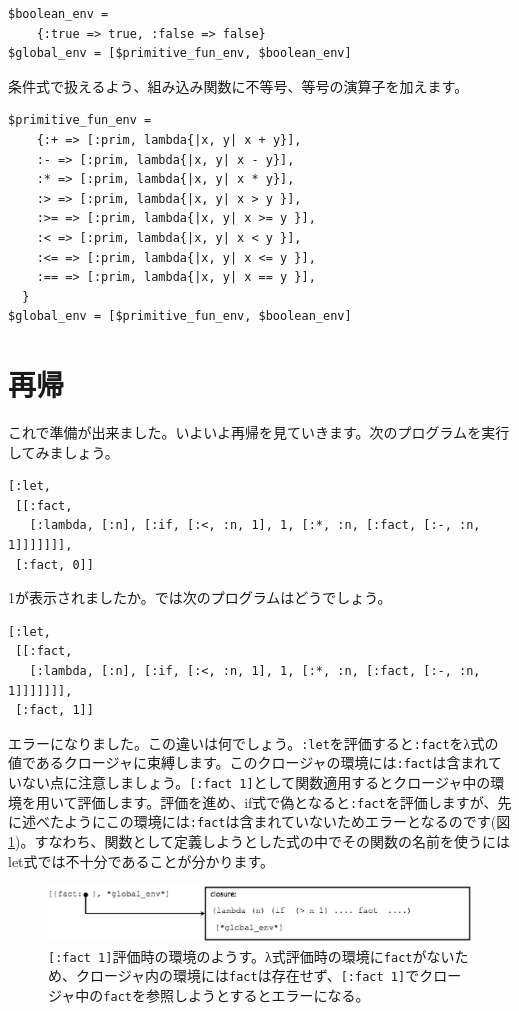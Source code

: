 \begin{lstlisting}
$boolean_env = 
    {:true => true, :false => false}
$global_env = [$primitive_fun_env, $boolean_env]
\end{lstlisting}

条件式で扱えるよう、組み込み関数に不等号、等号の演算子を加えます。

\begin{lstlisting}
$primitive_fun_env = 
    {:+ => [:prim, lambda{|x, y| x + y}],
    :- => [:prim, lambda{|x, y| x - y}],
    :* => [:prim, lambda{|x, y| x * y}],
    :> => [:prim, lambda{|x, y| x > y }],
    :>= => [:prim, lambda{|x, y| x >= y }],
    :< => [:prim, lambda{|x, y| x < y }],
    :<= => [:prim, lambda{|x, y| x <= y }],
    :== => [:prim, lambda{|x, y| x == y }],
  }
$global_env = [$primitive_fun_env, $boolean_env]
\end{lstlisting}

\section{再帰}

これで準備が出来ました。いよいよ再帰を見ていきます。次のプログラムを実行してみましょう。

\begin{lstlisting}
[:let, 
 [[:fact,
   [:lambda, [:n], [:if, [:<, :n, 1], 1, [:*, :n, [:fact, [:-, :n, 1]]]]]]], 
 [:fact, 0]]
\end{lstlisting}

1が表示されましたか。では次のプログラムはどうでしょう。

\begin{lstlisting}
[:let, 
 [[:fact,
   [:lambda, [:n], [:if, [:<, :n, 1], 1, [:*, :n, [:fact, [:-, :n, 1]]]]]]], 
 [:fact, 1]]
\end{lstlisting}

エラーになりました。この違いは何でしょう。{\tt :let}を評価すると{\tt :fact}をλ式の値であるクロージャに束縛します。このクロージャの環境には{\tt :fact}は含まれていない点に注意しましょう。{\tt [:fact 1]}として関数適用するとクロージャ中の環境を用いて評価します。評価を進め、if式で偽となると{\tt :fact}を評価しますが、先に述べたようにこの環境には{\tt :fact}は含まれていないためエラーとなるのです(図\ref{fig:let})。すなわち、関数として定義しようとした式の中でその関数の名前を使うにはlet式では不十分であることが分かります。

\begin{figure}[htbp]
\begin{center}
\includegraphics[width=140mm]{images/let.eps}
\end{center}
\caption{{\tt [:fact 1]}評価時の環境のようす。λ式評価時の環境に{\tt fact}がないため、クロージャ内の環境には{\tt fact}は存在せず、{\tt [:fact 1]}でクロージャ中の{\tt fact}を参照しようとするとエラーになる。}
\label{fig:let}
\end{figure}

